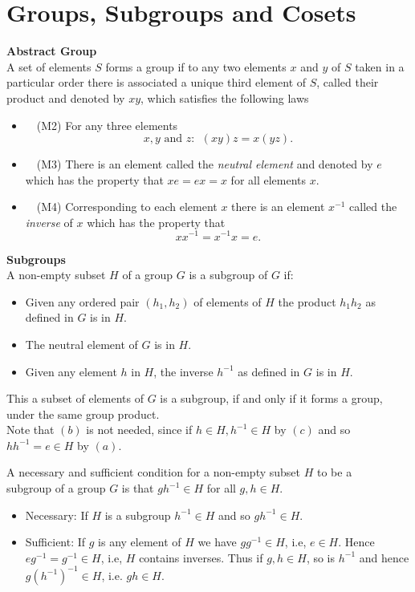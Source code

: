 \section{Groups, Subgroups and Cosets}

{\bf Abstract Group}\\
A set of elements $S$ forms a group if to any two elements $x$ and $y$ of $S$ taken in a particular order there is associated a unique third element of $S$, called their product and denoted by
$xy$, which satisfies the following laws

\begin{itemize}
\item[]~~(M2) For any three elements $$x, y \mbox{ and } z: ~~ (xy)z = x(yz).$$ 
\item[]~~(M3) There is an element called the {\it neutral element } and denoted by $e$ which has the property that $xe = ex = x$ for all elements $x$.
\item[]~~(M4) Corresponding to each element $x$ there is an element $x^{-1}$ called the {\it inverse } of $x$ which has the property that 
\[ xx^{-1} = x^{-1} x = e.\]
\end{itemize}

{\bf Subgroups }\\
A non-empty subset $H$ of a group $G$ is a subgroup of $G$ if: 
\begin{itemize}
\item[(a)] Given any ordered pair $(h_1, h_2)$ of elements of $H$ the product $h_1 h_2$ as defined in $G$ is in $H$.
\item[(b)] The neutral element of $G$ is in $H$.
\item[(c)] Given any element $h$ in $H$, the inverse $h^{-1}$ as defined in $G$ is in $H$. 
\end{itemize}
This a subset of elements of $G$ is a subgroup, if and only if it forms a group, under the same group product. \\

Note that $(b)$ is not needed, since if $h\in H, h^{-1} \in H$ by $(c)$ and so $h h^{-1} = e \in H$ by $(a)$. \\

\begin{theorem}
A necessary and sufficient condition for a non-empty subset $H$ to be a\\ subgroup of a group $G$ is that $gh^{-1} \in H$ for all $g, h \in H$.
\end{theorem}

\begin{itemize}
\item[(1)] Necessary: If $H$ is a subgroup $h^{-1}\in H$ and so $gh^{-1} \in H$.
\item[(2)] Sufficient: If $g$ is any element of $H$ we have $gg^{-1} \in H$, i.e, $e\in H$. Hence $eg^{-1} = g^{-1}\in H$, i.e, $H$ contains inverses. Thus if $g,h \in H$, so is $h^{-1}$ and hence
$g(h^{-1})^{-1} \in H$, i.e. $gh \in H$.
\end{itemize}

